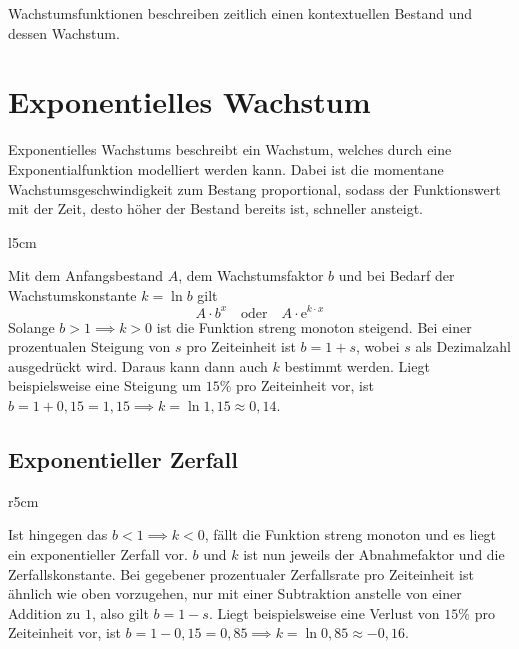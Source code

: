 \documentclass{article}
\begin{document}
\noindent Wachstumsfunktionen beschreiben zeitlich einen kontextuellen Bestand und dessen Wachstum.
\section{Exponentielles Wachstum}
Exponentielles Wachstums beschreibt ein Wachstum, welches durch eine Exponentialfunktion modelliert werden kann. Dabei ist die momentane Wachstumsgeschwindigkeit zum Bestang proportional, sodass der Funktionswert mit der Zeit, desto höher der Bestand bereits ist, schneller ansteigt.
\begin{wrapfigure}{l}{5cm}
  \centering
\end{wrapfigure} 
Mit dem Anfangsbestand $A$, dem Wachstumsfaktor $b$ und bei Bedarf der Wachstumskonstante $k=\ln{b}$ gilt
\[ 
 A \cdot b^x 
 \quad \text{oder} \quad 
 A \cdot \mathrm{e}^{k \cdot x}  
\] 
Solange ${b > 1 \implies k > 0}$ ist die Funktion streng monoton steigend. Bei einer prozentualen Steigung von $s$ pro Zeiteinheit ist ${b=1+s}$, wobei $s$ als Dezimalzahl ausgedrückt wird. Daraus kann dann auch $k$ bestimmt werden. \newline
Liegt beispielsweise eine Steigung um $15\%$ pro Zeiteinheit vor, ist ${b=1 + 0,15=1,15 \implies k=\ln{1,15} \approx 0,14}$. 
\newline 
\subsection{Exponentieller Zerfall}
\begin{wrapfigure}{r}{5cm}
  \centering
\end{wrapfigure}
Ist hingegen das ${b < 1 \implies k < 0}$, fällt die Funktion streng monoton und es liegt ein exponentieller Zerfall vor. $b$ und $k$ ist nun jeweils der Abnahmefaktor und die Zerfallskonstante. Bei gegebener prozentualer Zerfallsrate pro Zeiteinheit ist ähnlich wie oben vorzugehen, nur mit einer Subtraktion anstelle von einer Addition zu $1$, also gilt ${b=1-s}$. \newline
Liegt beispielsweise eine Verlust von $15\%$ pro Zeiteinheit vor, ist ${b=1-0,15=0,85 \implies k=\ln {0,85} \approx -0,16}$. \newline
 
\end{document}
